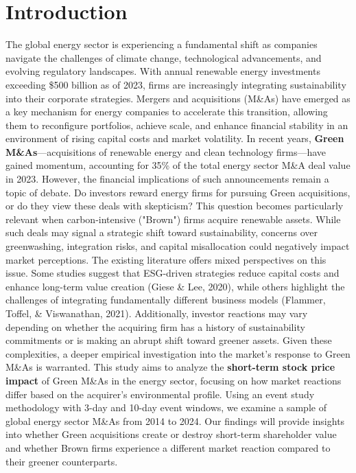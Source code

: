 \documentclass[a4paper]{article}
\begin{document}
\section{Introduction}
The global energy sector is experiencing a fundamental shift as companies navigate the challenges of climate change, technological advancements, and evolving regulatory landscapes. With annual renewable energy investments exceeding \$500 billion as of 2023, firms are increasingly integrating sustainability into their corporate strategies. Mergers and acquisitions (M\&As) have emerged as a key mechanism for energy companies to accelerate this transition, allowing them to reconfigure portfolios, achieve scale, and enhance financial stability in an environment of rising capital costs and market volatility.
\bigbreak
In recent years, \textbf{Green M\&As}—acquisitions of renewable energy and clean technology firms—have gained momentum, accounting for 35\% of the total energy sector M\&A deal value in 2023. However, the financial implications of such announcements remain a topic of debate. Do investors reward energy firms for pursuing Green acquisitions, or do they view these deals with skepticism? This question becomes particularly relevant when carbon-intensive ("Brown") firms acquire renewable assets. While such deals may signal a strategic shift toward sustainability, concerns over greenwashing, integration risks, and capital misallocation could negatively impact market perceptions.
\bigbreak
The existing literature offers mixed perspectives on this issue. Some studies suggest that ESG-driven strategies reduce capital costs and enhance long-term value creation (Giese \& Lee, 2020)\autocite{giese2020role}, while others highlight the challenges of integrating fundamentally different business models (Flammer, Toffel, \& Viswanathan, 2021)\autocite{flammer2021shareholder}. Additionally, investor reactions may vary depending on whether the acquiring firm has a history of sustainability commitments or is making an abrupt shift toward greener assets. Given these complexities, a deeper empirical investigation into the market's response to Green M\&As is warranted.
\bigbreak
This study aims to analyze the \textbf{short-term stock price impact} of Green M\&As in the energy sector, focusing on how market reactions differ based on the acquirer's environmental profile. Using an event study methodology with 3-day and 10-day event windows, we examine a sample of global energy sector M\&As from 2014 to 2024. Our findings will provide insights into whether Green acquisitions create or destroy short-term shareholder value and whether Brown firms experience a different market reaction compared to their greener counterparts.
\end{document}
